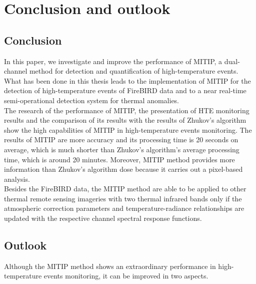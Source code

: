 \chapter{Conclusion and outlook}

\label{Chapter6}


\section{Conclusion}
In this paper, we investigate and improve the performance of MITIP, a dual-channel method for detection and quantification of high-temperature events. What has been done in this thesis leads to the implementation of MITIP for the detection of high-temperature events of FireBIRD data and to a near real-time semi-operational detection system for thermal anomalies.\\

\noindent The research of the performance of MITIP, the presentation of HTE monitoring results and the comparison of its results with the results of Zhukov's algorithm show the high capabilities of MITIP in high-temperature events monitoring. The results of MITIP are more accuracy and its processing time is 20 seconds on average, which is much shorter than Zhukov's algorithm's average processing time, which is around 20 minutes. Moreover, MITIP method provides more information than Zhukov's algorithm dose because it carries out a pixel-based analysis.\\

\noindent Besides the FireBIRD data, the MITIP method are able to be applied to other thermal remote sensing imageries with two thermal infrared bands only if the atmospheric correction parameters and temperature-radiance relationships are updated with the respective channel spectral response functions.\\


\section{Outlook}
Although the MITIP method shows an extraordinary performance in high-temperature events monitoring, it can be improved in two aspects.\\

